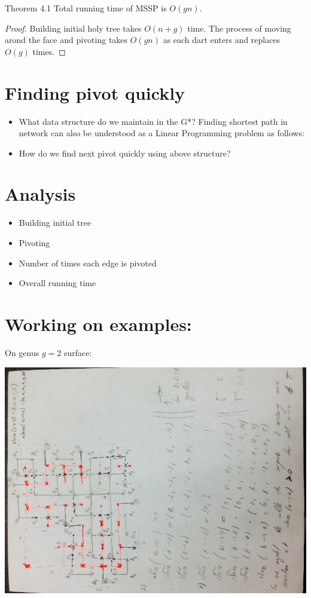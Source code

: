 \documentclass{article}
\begin{document}
\begin{oneshot}{Theorem 4.1}
Total running time of MSSP is $O(gn)$.
\end{oneshot}
\begin{proof}
Building initial holy tree takes $O(n + g)$ time. The process of moving arond the
face and pivoting takes $O(gn)$ as each dart enters and replaces $O(g)$ times.
\end{proof}

\section{Finding pivot quickly}
\begin{itemize}
\item What data structure do we maintain in the G*?
Finding shortest path in network can also be understood as a Linear Programming 
problem as follows:
\item How do we find next pivot quickly using above structure?
\end{itemize}

\section{Analysis}
\begin{itemize}
\item Building initial tree
\item Pivoting
\item Number of times each edge is pivoted
\item Overall running time
\end{itemize}

\newpage
\section{Working on examples:}

On genus $g = 2$ surface:
\begin{center}
\includegraphics[angle = -90, scale = 0.7]{figures/genus2.jpg}
\end{center}
\end{document}
